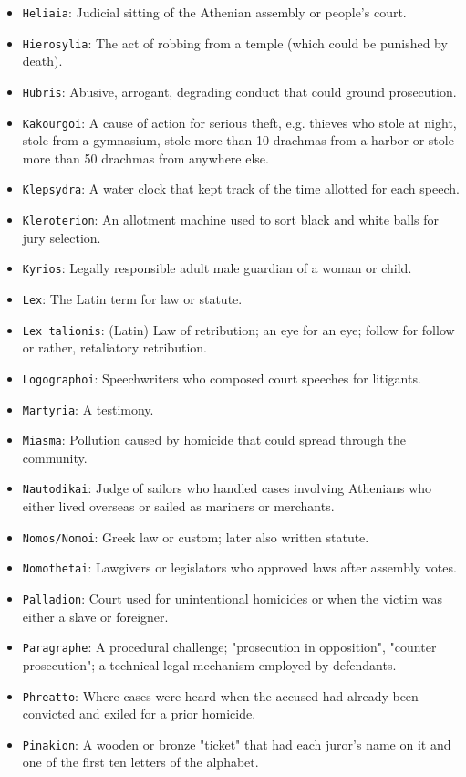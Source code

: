 \documentclass[11pt]{article}
\begin{document}
\begin{itemize}
\item \texttt{Heliaia}: Judicial sitting of the Athenian assembly or people's court.
\item \texttt{Hierosylia}: The act of robbing from a temple (which could be punished by death).
\item \texttt{Hubris}: Abusive, arrogant, degrading conduct that could ground prosecution.
\item \texttt{Kakourgoi}: A cause of action for serious theft, e.g. thieves who stole at night, stole from a gymnasium, stole more than 10 drachmas from a harbor or stole more than 50 drachmas from anywhere else.
\item \texttt{Klepsydra}: A water clock that kept track of the time allotted for each speech.
\item \texttt{Kleroterion}: An allotment machine used to sort black and white balls for jury selection.
\item \texttt{Kyrios}: Legally responsible adult male guardian of a woman or child.
\item \texttt{Lex}: The Latin term for law or statute.
\item \texttt{Lex talionis}: (Latin) Law of retribution; an eye for an eye; follow for follow or rather, retaliatory retribution.
\item \texttt{Logographoi}: Speechwriters who composed court speeches for litigants.
\item \texttt{Martyria}: A testimony.
\item \texttt{Miasma}: Pollution caused by homicide that could spread through the community.
\item \texttt{Nautodikai}: Judge of sailors who handled cases involving Athenians who either lived overseas or sailed as mariners or merchants.
\item \texttt{Nomos/Nomoi}: Greek law or custom; later also written statute.
\item \texttt{Nomothetai}: Lawgivers or legislators who approved laws after assembly votes.
\item \texttt{Palladion}: Court used for unintentional homicides or when the victim was either a slave or foreigner.
\item \texttt{Paragraphe}: A procedural challenge; "prosecution in opposition", "counter prosecution"; a technical legal mechanism employed by defendants.
\item \texttt{Phreatto}: Where cases were heard when the accused had already been convicted and exiled for a prior homicide.
\item \texttt{Pinakion}: A wooden or bronze "ticket" that had each juror's name on it and one of the first ten letters of the alphabet.

\end{itemize}
\end{document}
